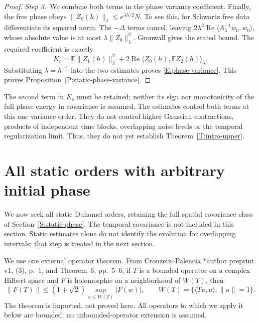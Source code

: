 \documentclass[12pt,oneside,openany]{book}
\numberwithin{equation}{section}
\theoremstyle{nogostyle}
\theoremstyle{definition}
\newcommand{\E}{\mathbb{E}}
\begin{document}
\begin{proof}
  \medskip
  \noindent\textit{Step 3.~}We combine both terms in the phase variance
  coefficient.
  Finally, the free phase obeys $\|Z_0(h)\|_\lambda \le e^{\lambda h/2}N$. To
  see this, for Schwartz free data differentiate its squared norm. The $-\Delta$
  terms cancel, leaving $2\lambda^2\operatorname{Re}\langle
  A_\lambda^{-1}\dot{w}_0,w_0\rangle$, whose absolute value is at most
  $\lambda\|Z_0\|_\lambda^2$. Gronwall gives the stated bound. The required
  coefficient is exactly
  \[
    K_\epsilon=\E\|Z_1(h)\|_\lambda^2+
    2\operatorname{Re}\langle Z_0(h),\E Z_2(h)\rangle_\lambda.
  \]
  Substituting $\lambda = h^{-1}$ into the two estimates proves
  \eqref{E:phase-variance}. This proves
  Proposition~\ref{P:static-phase-variance}.
\end{proof}

The second term in $K_\epsilon$ must be retained; neither its sign nor
monotonicity of the full phase energy in covariance is assumed. The estimates
control both terms at this one variance order. They do not control higher
Gaussian contractions, products of independent time blocks, overlapping noise
levels or the temporal regularization limit. Thus, they do not yet establish
Theorem~\ref{T:intro-upper}.

\section{All static orders with arbitrary initial phase}
\label{S:static-all-orders}

We now seek all static Duhamel orders, retaining the full spatial covariance
class of Section~\ref{S:static-phase}. The temporal covariance is not included
in this section. Static estimates alone do not identify the evolution for
overlapping intervals; that step is treated in the next section.

We use one external operator theorem. From Crouzeix--Palencia
\cite{crouzeix.palencia:source2017:numerical}*{author preprint v1, (3), p.~1,
and Theorem~6, pp.~5--6}, if $T$ is a bounded operator on a complex Hilbert
space and $F$ is holomorphic on a neighborhood of $\overline{W(T)}$, then
\begin{equation}\label{E:cp-input}
  \|F(T)\|\le(1+\sqrt2)\sup_{w\in W(T)}|F(w)|,\qquad
  W(T)=\{\langle Tu,u\rangle:\|u\|=1\}.
\end{equation}
The theorem is imported, not proved here. All operators to which we apply it
below are bounded; no unbounded-operator extension is assumed.
\end{document}
